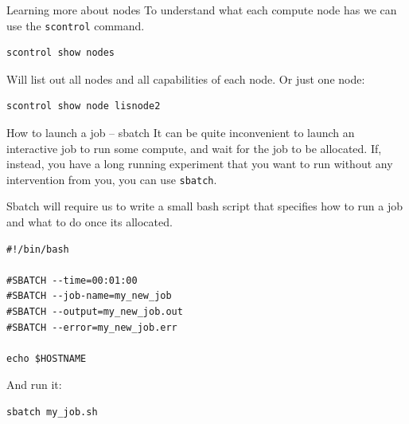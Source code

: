 \documentclass[10pt]{beamer}
\begin{document}
\begin{frame}[label={sec:org2b0c855},fragile]{Learning more about nodes}
 To understand what each compute node has we can use the \texttt{scontrol} command.

\begin{verbatim}
scontrol show nodes
\end{verbatim}

Will list out all nodes and all capabilities of each node. Or just one node:

\begin{verbatim}
scontrol show node lisnode2
\end{verbatim}
\end{frame}

\begin{frame}[label={sec:orga02b1e8},fragile]{How to launch a job -- sbatch}
 It can be quite inconvenient to launch an interactive job to run some compute,
and wait for the job to be allocated. If, instead, you have a long running
experiment that you want to run without any intervention from you, you can use
\texttt{sbatch}.

Sbatch will require us to write a small bash script that specifies how to run a
job and what to do once its allocated.

\begin{verbatim}
#!/bin/bash

#SBATCH --time=00:01:00
#SBATCH --job-name=my_new_job
#SBATCH --output=my_new_job.out
#SBATCH --error=my_new_job.err

echo $HOSTNAME
\end{verbatim}

And run it:

\begin{verbatim}
sbatch my_job.sh
\end{verbatim}
\end{frame}
\end{document}
